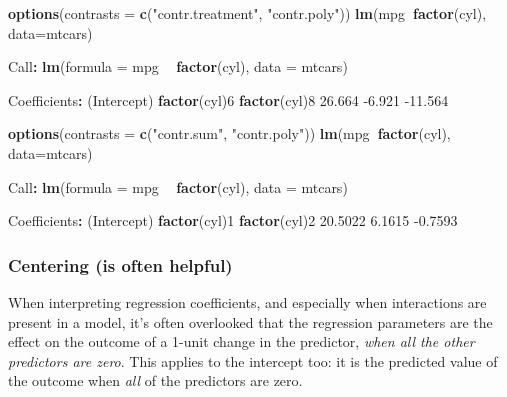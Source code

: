 \documentclass[]{article}
\newenvironment{Shaded}{\begin{snugshade}}{\end{snugshade}}
\newcommand{\DataTypeTok}[1]{\textcolor[rgb]{0.13,0.29,0.53}{#1}}
\newcommand{\DecValTok}[1]{\textcolor[rgb]{0.00,0.00,0.81}{#1}}
\newcommand{\FloatTok}[1]{\textcolor[rgb]{0.00,0.00,0.81}{#1}}
\newcommand{\KeywordTok}[1]{\textcolor[rgb]{0.13,0.29,0.53}{\textbf{#1}}}
\newcommand{\NormalTok}[1]{#1}
\newcommand{\OperatorTok}[1]{\textcolor[rgb]{0.81,0.36,0.00}{\textbf{#1}}}
\newcommand{\StringTok}[1]{\textcolor[rgb]{0.31,0.60,0.02}{#1}}
\begin{document}
\begin{Shaded}
\begin{Highlighting}[]
\KeywordTok{options}\NormalTok{(}\DataTypeTok{contrasts =} \KeywordTok{c}\NormalTok{(}\StringTok{"contr.treatment"}\NormalTok{, }\StringTok{"contr.poly"}\NormalTok{))}
\KeywordTok{lm}\NormalTok{(mpg}\OperatorTok{~}\KeywordTok{factor}\NormalTok{(cyl), }\DataTypeTok{data=}\NormalTok{mtcars)}

\NormalTok{Call}\OperatorTok{:}
\KeywordTok{lm}\NormalTok{(}\DataTypeTok{formula =}\NormalTok{ mpg }\OperatorTok{~}\StringTok{ }\KeywordTok{factor}\NormalTok{(cyl), }\DataTypeTok{data =}\NormalTok{ mtcars)}

\NormalTok{Coefficients}\OperatorTok{:}
\StringTok{ }\NormalTok{(Intercept)  }\KeywordTok{factor}\NormalTok{(cyl)}\DecValTok{6}  \KeywordTok{factor}\NormalTok{(cyl)}\DecValTok{8}  
      \FloatTok{26.664}        \FloatTok{-6.921}       \FloatTok{-11.564}  

\KeywordTok{options}\NormalTok{(}\DataTypeTok{contrasts =} \KeywordTok{c}\NormalTok{(}\StringTok{"contr.sum"}\NormalTok{, }\StringTok{"contr.poly"}\NormalTok{))}
\KeywordTok{lm}\NormalTok{(mpg}\OperatorTok{~}\KeywordTok{factor}\NormalTok{(cyl), }\DataTypeTok{data=}\NormalTok{mtcars)}

\NormalTok{Call}\OperatorTok{:}
\KeywordTok{lm}\NormalTok{(}\DataTypeTok{formula =}\NormalTok{ mpg }\OperatorTok{~}\StringTok{ }\KeywordTok{factor}\NormalTok{(cyl), }\DataTypeTok{data =}\NormalTok{ mtcars)}

\NormalTok{Coefficients}\OperatorTok{:}
\StringTok{ }\NormalTok{(Intercept)  }\KeywordTok{factor}\NormalTok{(cyl)}\DecValTok{1}  \KeywordTok{factor}\NormalTok{(cyl)}\DecValTok{2}  
     \FloatTok{20.5022}        \FloatTok{6.1615}       \FloatTok{-0.7593}  
\end{Highlighting}
\end{Shaded}

\hypertarget{centering}{%
\subsubsection*{Centering (is often helpful)}\label{centering}}

When interpreting regression coefficients, and especially when interactions are
present in a model, it's often overlooked that the regression parameters are the
effect on the outcome of a 1-unit change in the predictor, \emph{when all the other
predictors are zero}. This applies to the intercept too: it is the predicted
value of the outcome when \emph{all} of the predictors are zero.
\end{document}
